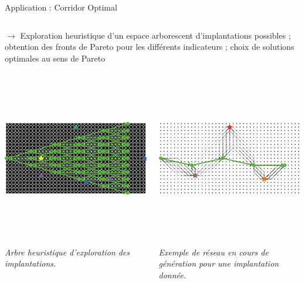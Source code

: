\documentclass{beamer}
\begin{document}
\begin{frame}{}
\begin{columns}[t]
\begin{column}{.49\textwidth}
\begin{block}{Application : Corridor Optimal}
\begin{columns}[t]
\begin{column}{.95\textwidth}
\begin{justify}
          \bigskip
          $\rightarrow$ Exploration heuristique d'un espace arborescent d'implantations possibles ; obtention des fronts de Pareto pour les différents indicateurs ; choix de solutions optimales au sens de Pareto
          \vspace{1cm}
          \begin{columns}[t]
        \begin{column}{.48\textwidth}
          \includegraphics[width=\columnwidth,height=7cm]{figures/implantationtree}
          
          \textit{Arbre heuristique d'exploration des implantations.}
          \end{column}
          \begin{column}{.48\textwidth}
          \includegraphics[width=\columnwidth,height=7cm]{figures/ImplantationTreeview}
          
          \textit{Exemple de réseau en cours de génération pour une implantation donnée.}
          \end{column}
          
          \end{columns}
          \vspace{1.5cm}
          

\end{justify}
\end{column}
\end{columns}
\end{block}
\end{column}
\end{columns}
\end{frame}
\end{document}
